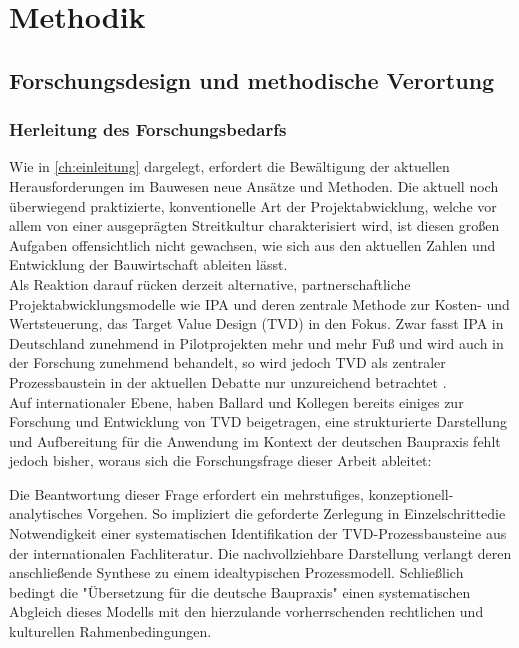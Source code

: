 \chapter{Methodik}
\label{ch:methodik}

\section{Forschungsdesign und methodische Verortung}
\label{sec: 3.1}
\subsection{Herleitung des Forschungsbedarfs}
\label{sec: 3.1.1}

Wie in \cref{ch:einleitung} dargelegt, erfordert die Bewältigung der aktuellen Herausforderungen im Bauwesen neue Ansätze und Methoden. Die aktuell noch überwiegend praktizierte, konventionelle  Art der Projektabwicklung, welche vor allem von einer ausgeprägten Streitkultur charakterisiert wird, ist diesen großen Aufgaben offensichtlich nicht gewachsen, wie sich aus den aktuellen Zahlen und Entwicklung der Bauwirtschaft ableiten lässt.\\
Als Reaktion darauf rücken derzeit alternative, partnerschaftliche Projektabwicklungsmodelle wie \ac{IPA} und deren zentrale Methode zur Kosten- und Wertsteuerung, das Target Value Design (\ac{TVD}) in den Fokus. Zwar fasst IPA in Deutschland zunehmend in Pilotprojekten mehr und mehr Fuß und wird auch in der Forschung zunehmend behandelt, so wird jedoch TVD als zentraler Prozessbaustein in der aktuellen Debatte nur unzureichend betrachtet \autocite{haghsheno_ipa-report_2025}.\\
Auf internationaler Ebene, haben Ballard und Kollegen bereits einiges zur Forschung und Entwicklung von \ac{TVD} beigetragen, eine strukturierte Darstellung und Aufbereitung für die Anwendung im Kontext der deutschen Baupraxis fehlt jedoch bisher, woraus sich die Forschungsfrage dieser Arbeit ableitet:


Die Beantwortung dieser Frage erfordert ein mehrstufiges, konzeptionell-analytisches Vorgehen. So impliziert die geforderte \glqq Zerlegung in Einzelschritte\grqq die Notwendigkeit einer systematischen Identifikation der TVD-Prozessbausteine aus der internationalen Fachliteratur. Die nachvollziehbare Darstellung verlangt deren anschließende Synthese zu einem idealtypischen Prozessmodell. Schließlich bedingt die "Übersetzung für die deutsche Baupraxis" einen systematischen Abgleich dieses Modells mit den hierzulande vorherrschenden rechtlichen und kulturellen Rahmenbedingungen.

